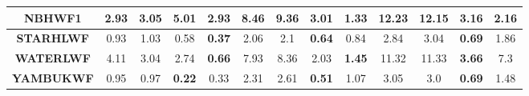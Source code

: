 \begin{table}
\begin{tabular}{|l|l|l|l|l|l|l|l|l|l|l|l|l|}
\multicolumn{1}{|c|}{\textbf{NBHWF1}} & \multicolumn{1}{|c|}{\textbf{2.93}} & \multicolumn{1}{|c|}{3.05} & \multicolumn{1}{|c|}{5.01} & \multicolumn{1}{|c|}{\textbf{2.93}} & \multicolumn{1}{|c|}{8.46} & \multicolumn{1}{|c|}{9.36} & \multicolumn{1}{|c|}{3.01} & \multicolumn{1}{|c|}{\textbf{1.33}} & \multicolumn{1}{|c|}{12.23} & \multicolumn{1}{|c|}{12.15} & \multicolumn{1}{|c|}{3.16} & \multicolumn{1}{|c|}{\textbf{2.16}} \\ \hline
\multicolumn{1}{|c|}{\textbf{STARHLWF}} & \multicolumn{1}{|c|}{0.93} & \multicolumn{1}{|c|}{1.03} & \multicolumn{1}{|c|}{0.58} & \multicolumn{1}{|c|}{\textbf{0.37}} & \multicolumn{1}{|c|}{2.06} & \multicolumn{1}{|c|}{2.1} & \multicolumn{1}{|c|}{\textbf{0.64}} & \multicolumn{1}{|c|}{0.84} & \multicolumn{1}{|c|}{2.84} & \multicolumn{1}{|c|}{3.04} & \multicolumn{1}{|c|}{\textbf{0.69}} & \multicolumn{1}{|c|}{1.86} \\ \hline
\multicolumn{1}{|c|}{\textbf{WATERLWF}} & \multicolumn{1}{|c|}{4.11} & \multicolumn{1}{|c|}{3.04} & \multicolumn{1}{|c|}{2.74} & \multicolumn{1}{|c|}{\textbf{0.66}} & \multicolumn{1}{|c|}{7.93} & \multicolumn{1}{|c|}{8.36} & \multicolumn{1}{|c|}{2.03} & \multicolumn{1}{|c|}{\textbf{1.45}} & \multicolumn{1}{|c|}{11.32} & \multicolumn{1}{|c|}{11.33} & \multicolumn{1}{|c|}{\textbf{3.66}} & \multicolumn{1}{|c|}{7.3} \\ \hline
\multicolumn{1}{|c|}{\textbf{YAMBUKWF}} & \multicolumn{1}{|c|}{0.95} & \multicolumn{1}{|c|}{0.97} & \multicolumn{1}{|c|}{\textbf{0.22}} & \multicolumn{1}{|c|}{0.33} & \multicolumn{1}{|c|}{2.31} & \multicolumn{1}{|c|}{2.61} & \multicolumn{1}{|c|}{\textbf{0.51}} & \multicolumn{1}{|c|}{1.07} & \multicolumn{1}{|c|}{3.05} & \multicolumn{1}{|c|}{3.0} & \multicolumn{1}{|c|}{\textbf{0.69}} & \multicolumn{1}{|c|}{1.48} \\ \hline

\end{tabular}
\label{tab:mae_result}
\end{table}